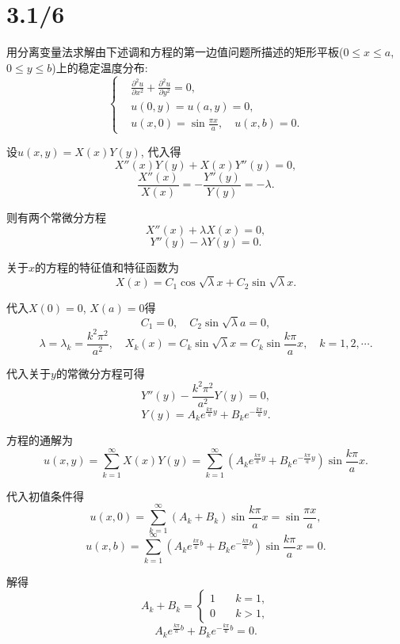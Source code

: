 \documentclass[11pt,a4paper]{article}
\author{刘逸灏 (515370910207)}
\begin{document}
\maketitle

\section{3.1/6}
\begin{problem}
用分离变量法求解由下述调和方程的第一边值问题所描述的矩形平板($0\leqslant x\leqslant a$, $0\leqslant y\leqslant b$)上的稳定温度分布:
$$\left\{\begin{aligned}
     & \frac{\partial^2u}{\partial x^2}+\frac{\partial^2u}{\partial y^2}=0, \\
     & u(0,y)=u(a,y)=0,                                                     \\
     & u(x,0)=\sin\frac{\pi x}{a},\quad u(x,b)=0.
  \end{aligned}\right.$$
\end{problem}

设$u(x,y)=X(x)Y(y)$, 代入得
$$X''(x)Y(y)+X(x)Y''(y)=0,$$
$$\frac{X''(x)}{X(x)}=-\frac{Y''(y)}{Y(y)}=-\lambda.$$

则有两个常微分方程
$$X''(x)+\lambda X(x)=0,$$
$$Y''(y)-\lambda Y(y)=0.$$

关于$x$的方程的特征值和特征函数为
$$X(x)=C_1\cos\sqrt{\lambda}x+C_2\sin\sqrt{\lambda}x.$$

代入$X(0)=0$, $X(a)=0$得
$$C_1=0,\quad C_2\sin\sqrt{\lambda}a=0,$$
$$\lambda=\lambda_k=\frac{k^2\pi^2}{a^2},\quad X_k(x)=C_k\sin\sqrt{\lambda}x=C_k\sin\frac{k\pi}{a}x,\quad k=1,2,\cdots.$$

代入关于$y$的常微分方程可得
$$Y''(y)-\frac{k^2\pi^2}{a^2} Y(y)=0,$$
$$Y(y)=A_ke^{\frac{k\pi}{a}y}+B_ke^{-\frac{k\pi}{a}y}.$$

方程的通解为
$$u(x,y)=\sum_{k=1}^\infty X(x)Y(y)=\sum_{k=1}^\infty\left(A_ke^{\frac{k\pi}{a}y}+B_ke^{-\frac{k\pi}{a}y}\right)\sin\frac{k\pi}{a}x.$$

代入初值条件得
$$u(x,0)=\sum_{k=1}^\infty(A_k+B_k)\sin\frac{k\pi}{a}x=\sin\frac{\pi x}{a},$$
$$u(x,b)=\sum_{k=1}^\infty\left(A_ke^{\frac{k\pi}{a}b}+B_ke^{-\frac{k\pi}{a}b}\right)\sin\frac{k\pi}{a}x=0.$$

解得
$$A_k+B_k=\left\{\begin{aligned}
    1 & \quad k=1, \\ 0 &\quad k>1,
  \end{aligned}\right.$$
$$A_ke^{\frac{k\pi}{a}b}+B_ke^{-\frac{k\pi}{a}b}=0.$$
\end{document}
